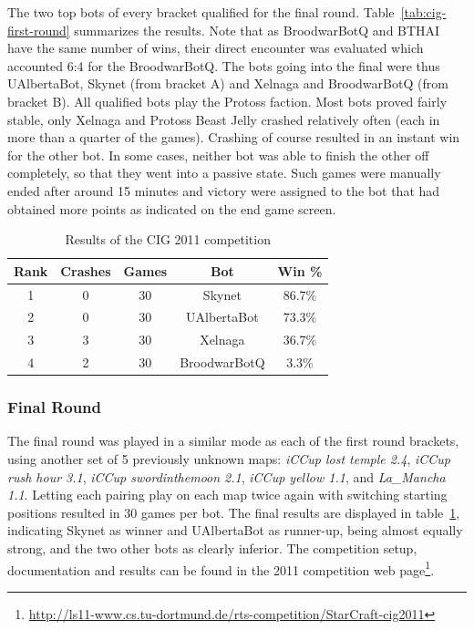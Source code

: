 \documentclass{llncs}
\begin{document}
The two top bots of every bracket qualified
for the final round. Table~\ref{tab:cig-first-round} summarizes
the results.
Note that as BroodwarBotQ and BTHAI have the same number of wins,
their direct encounter was evaluated which accounted 6:4 for the BroodwarBotQ.
The bots going into the final were thus UAlbertaBot, Skynet (from bracket A)
and Xelnaga and BroodwarBotQ (from bracket B). All qualified bots play the
Protoss faction. Most bots proved fairly stable, only Xelnaga and Protoss 
Beast Jelly crashed relatively often (each in more than a quarter of the games). 
Crashing of course resulted in an instant win for the other bot.
In some cases, neither bot was able to finish the other off completely,
so that they went into a passive state. Such games were manually ended after
around 15 minutes and victory were assigned to the bot that had obtained more
points as indicated on the end game screen.

\begin{table}[!b]
\caption{Results of the CIG 2011 competition}
\label{tab:cig-final-round}
\centering
\begin{tabular}{|c|c|c|c|c|}
\hline
{\bfseries Rank} & {\bfseries Crashes} & {\bfseries Games} & {\bfseries Bot} & {\bfseries Win \%} \\
\hline
1 & 0 &  30 &  Skynet       &  86.7\%\\
2 & 0 &  30 &  UAlbertaBot  &  73.3\%\\
3 & 3 &  30 &  Xelnaga      &  36.7\%\\
4 & 2 &  30 &  BroodwarBotQ   &  3.3\%\\
\hline
\end{tabular}
\end{table}



\subsubsection{Final Round}
\label{sec:cig-final-round}

The final round was played in a similar mode as each of the
first round brackets,
using another set of 5 previously unknown maps:
\emph{iCCup lost temple 2.4}, \emph{iCCup rush hour 3.1},
\emph{iCCup swordinthemoon 2.1}, \emph{iCCup yellow 1.1},
and \emph{La\_Mancha 1.1}. 
Letting each pairing play on each map twice again with
switching starting positions resulted in 30 games per bot.
The final results are displayed in table~\ref{tab:cig-final-round},
indicating Skynet as winner and UAlbertaBot as runner-up, being
almost equally strong, and the two other bots as clearly inferior.
The competition setup, documentation and results can be found
in the 2011 competition web page\footnote{\url{http://ls11-www.cs.tu-dortmund.de/rts-competition/StarCraft-cig2011}}.
\end{document}
